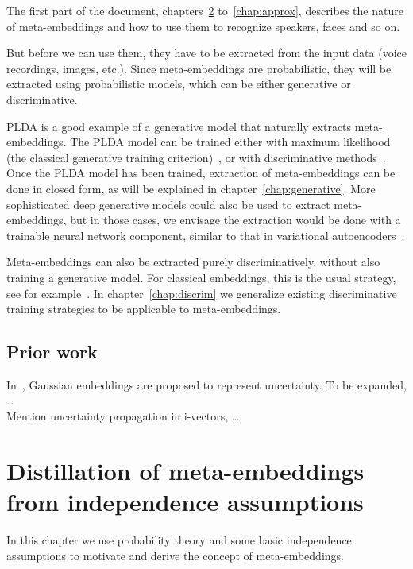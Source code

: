 \documentclass[a4paper,oneside,12pt,english]{report}
\begin{document}
The first part of the document, chapters~\ref{chap:fp} to~\ref{chap:approx}, describes the nature of meta-embeddings and how to use them to recognize speakers, faces and so on. 

But before we can use them, they have to be extracted from the input data (voice recordings, images, etc.). Since meta-embeddings are probabilistic, they will be extracted using probabilistic models, which can be either generative or discriminative. 

PLDA is a good example of a generative model that naturally extracts meta-embeddings. The PLDA model can be trained either with maximum likelihood (the classical generative training criterion)~\cite{ht-plda,SPP}, or with discriminative methods~\cite{Sandro_pairs,Sandro_PSVM}. Once the PLDA model has been trained, extraction of meta-embeddings can be done in closed form, as will be explained in chapter~\ref{chap:generative}. More sophisticated deep generative models could also be used to extract meta-embeddings, but in those cases, we envisage the extraction would be done with a trainable neural network component, similar to that in variational autoencoders~\cite{VAE}.

Meta-embeddings can also be extracted purely discriminatively, without also training a generative model. For classical embeddings, this is the usual strategy, see for example~\cite{Facenet,end2end,DSIS17,Voxceleb,LIMSI_Language_embedding}. In chapter~\ref{chap:discrim} we generalize existing discriminative training strategies to be applicable to meta-embeddings. 


\section{Prior work}
In~\cite{Vilnis}, Gaussian embeddings are proposed to represent uncertainty. To be expanded, \ldots\\

\noindent Mention uncertainty propagation in i-vectors\cite{Uncertainty-Sandro, Uncertainty-Patrick, Uncertainty-Themos, Uncertainty-Bilbao}, \ldots 

\chapter{Distillation of meta-embeddings from independence assumptions}
\label{chap:fp}
In this chapter we use probability theory and some basic independence assumptions to motivate and derive the concept of meta-embeddings.  
\end{document}
